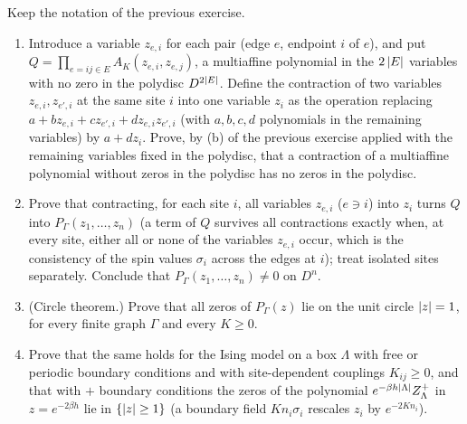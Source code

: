 \begin{exercise}
Keep the notation of the previous exercise.
\begin{enumerate}[label=(\alph*)]
\item Introduce a variable $z_{e,i}$ for each pair (edge $e$, endpoint $i$
of $e$), and put $Q=\prod_{e=ij\in E}A_K(z_{e,i},z_{e,j})$, a multiaffine
polynomial in the $2\left\lvert E\right\rvert$ variables with no zero in the polydisc
$D^{2\left\lvert E\right\rvert}$.  Define the contraction of two variables $z_{e,i},z_{e',i}$ at
the same site $i$ into one variable $z_i$ as the operation replacing
$a+bz_{e,i}+cz_{e',i}+dz_{e,i}z_{e',i}$ (with $a,b,c,d$ polynomials in the
remaining variables) by $a+dz_i$.  Prove, by (b) of the previous exercise
applied with the remaining variables fixed in the polydisc, that a
contraction of a multiaffine polynomial without zeros in the polydisc has no
zeros in the polydisc.
\item Prove that contracting, for each site $i$, all variables $z_{e,i}$
($e\ni i$) into $z_i$ turns $Q$ into $P_\Gamma(z_1,\dots,z_n)$ (a term of $Q$
survives all contractions exactly when, at every site, either all or none of
the variables $z_{e,i}$ occur, which is the consistency of the spin values
$\sigma_i$ across the edges at $i$); treat isolated sites separately.
Conclude that $P_\Gamma(z_1,\dots,z_n)\ne0$ on $D^n$.
\item (Circle theorem.)  Prove that all zeros of $P_\Gamma(z)$ lie on the
unit circle $\left\lvert z\right\rvert=1$, for every finite graph $\Gamma$ and every $K\ge0$.
\item Prove that the same holds for the Ising model on a box $\Lambda$ with
free or periodic boundary conditions and with site-dependent couplings
$K_{ij}\ge0$, and that with $+$ boundary conditions the zeros of the
polynomial $e^{-\beta h\left\lvert \Lambda\right\rvert}Z^+_\Lambda$ in $z=e^{-2\beta h}$ lie in
$\{\left\lvert z\right\rvert\ge1\}$ (a boundary field $Kn_i\sigma_i$ rescales $z_i$ by $e^{-2Kn_i}$).
\end{enumerate}
\end{exercise}

